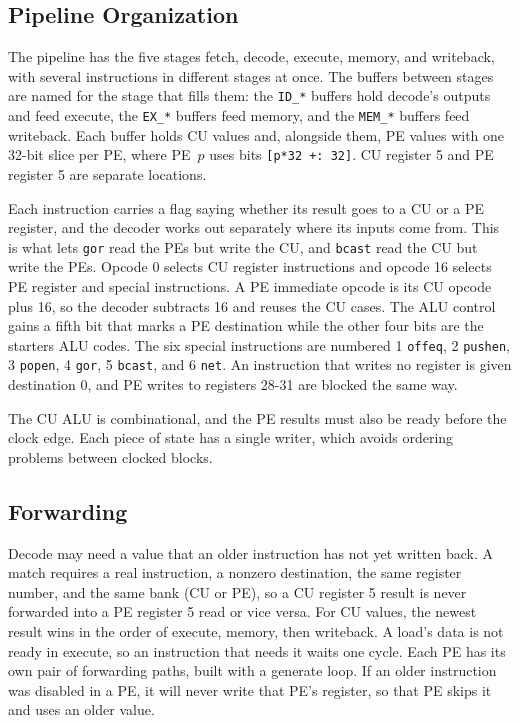 \documentclass[sigconf,nonacm]{acmart}
\begin{document}
\subsection{Pipeline Organization}
The pipeline has the five stages fetch, decode, execute, memory, and writeback, with several instructions in different stages at once. The buffers between stages are named for the stage that fills them: the \texttt{ID\_*} buffers hold decode's outputs and feed execute, the \texttt{EX\_*} buffers feed memory, and the \texttt{MEM\_*} buffers feed writeback. Each buffer holds CU values and, alongside them, PE values with one 32-bit slice per PE, where PE~$p$ uses bits \texttt{[p*32 +: 32]}. CU register 5 and PE register 5 are separate locations.

Each instruction carries a flag saying whether its result goes to a CU or a PE register, and the decoder works out separately where its inputs come from. This is what lets \texttt{gor} read the PEs but write the CU, and \texttt{bcast} read the CU but write the PEs. Opcode 0 selects CU register instructions and opcode 16 selects PE register and special instructions. A PE immediate opcode is its CU opcode plus 16, so the decoder subtracts 16 and reuses the CU cases. The ALU control gains a fifth bit that marks a PE destination while the other four bits are the starters ALU codes. The six special instructions are numbered 1 \texttt{offeq}, 2 \texttt{pushen}, 3 \texttt{popen}, 4 \texttt{gor}, 5 \texttt{bcast}, and 6 \texttt{net}. An instruction that writes no register is given destination 0, and PE writes to registers 28-31 are blocked the same way.

The CU ALU is combinational, and the PE results must also be ready before the clock edge. Each piece of state has a single writer, which avoids ordering problems between clocked blocks.

\subsection{Forwarding}
Decode may need a value that an older instruction has not yet written back. A match requires a real instruction, a nonzero destination, the same register number, and the same bank (CU or PE), so a CU register 5 result is never forwarded into a PE register 5 read or vice versa. For CU values, the newest result wins in the order of execute, memory, then writeback. A load's data is not ready in execute, so an instruction that needs it waits one cycle. Each PE has its own pair of forwarding paths, built with a generate loop. If an older instruction was disabled in a PE, it will never write that PE's register, so that PE skips it and uses an older value.
\end{document}
